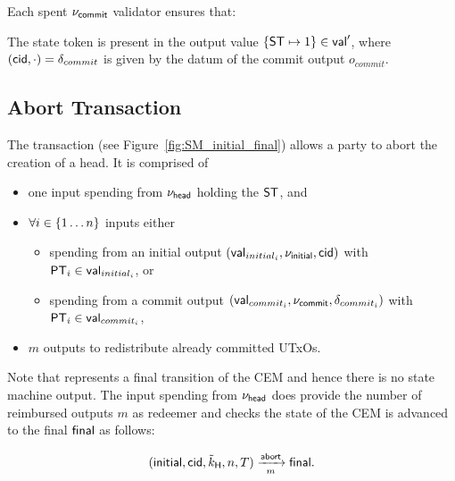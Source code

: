 \noindent Each spent $\nu_\mathsf{commit}$ validator ensures that:
\begin{menumerate}
  \item The state token is present in the output value
  $\{\mathsf{ST} \mapsto 1\} \in \mathsf{val}'$, where $(\mathsf{cid},\cdot) = \delta_{commit}$ is given
  by the datum of the commit output $o_{commit}$.
\end{menumerate}

\subsection{Abort Transaction}\label{sec:abort-tx}



The \mtxAbort{} transaction (see Figure~\ref{fig:SM_initial_final}) allows a
party to abort the creation of a head. It is comprised of
\begin{itemize}
  \item one input spending from $\nu_\mathsf{head}$ holding the $\mathsf{ST}$, and
  \item $\forall i \in \{1 \dots n\}$ inputs either
    \begin{itemize}
      \item spending from an initial output $(\mathsf{val}_{initial_i}, \nu_\mathsf{initial}, \mathsf{cid})$ with $\mathsf{PT}_{i} \in \mathsf{val}_{initial_i}$, or
      \item spending from a commit output $(\mathsf{val}_{commit_i}, \nu_\mathsf{commit}, \delta_{commit_i})$ with $\mathsf{PT}_{i} \in \mathsf{val}_{commit_{i}}$,
    \end{itemize}
  \item $m$ outputs to redistribute already committed UTxOs.
\end{itemize}
Note that \mtxAbort{} represents a final transition of the CEM and hence there
is no state machine output. The input spending from $\nu_\mathsf{head}$ does provide the
number of reimbursed outputs $m$ as redeemer and checks the state of the CEM is
advanced to the final $\mathsf{final}$ as follows:

\[
   (\mathsf{initial},\mathsf{cid},\tilde{k}_{\mathsf{H}},n,T) \xrightarrow[m]{\mathsf{abort}} \mathsf{final}.
\]

